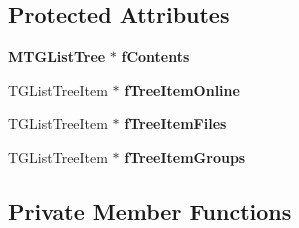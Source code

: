 \subsection*{Protected Attributes}
\begin{DoxyCompactItemize}
\item 
{\bf MTGListTree} $\ast$ {\bf fContents}
\item 
TGListTreeItem $\ast$ {\bf fTreeItemOnline}
\item 
TGListTreeItem $\ast$ {\bf fTreeItemFiles}
\item 
TGListTreeItem $\ast$ {\bf fTreeItemGroups}
\end{DoxyCompactItemize}
\subsection*{Private Member Functions}
